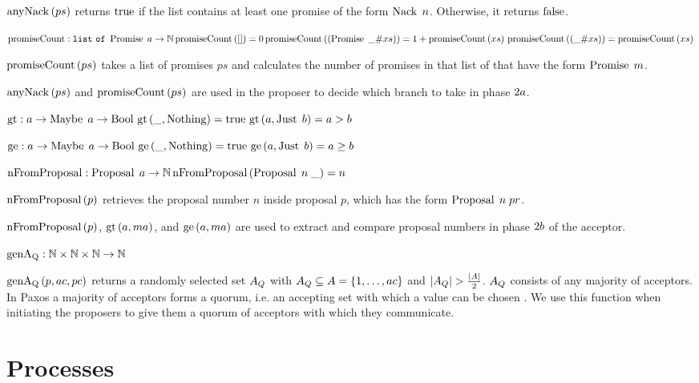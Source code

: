 $\operatorname{anyNack}\left(ps\right)$ returns $\operatorname{true}$ if the list contains at least one promise of the form $\operatorname{Nack}\; n$.
Otherwise, it returns $\operatorname{false}$.

$\operatorname{promiseCount} : \mathtt{list\ of\ } \operatorname{Promise}\; a \to \mathbb{N}\\
\operatorname{promiseCount}\left(\mathtt{[]}\right) = 0\\
\operatorname{promiseCount}\left(\left(\operatorname{Promise}\; \mathtt{\_} \mathtt{\#} xs\right)\right) = 1 + \operatorname{promiseCount}\left(xs\right)\\
\operatorname{promiseCount}\left(\left(\mathtt{\_} \mathtt{\#} xs\right)\right) = \operatorname{promiseCount}\left(xs\right)$

$\operatorname{promiseCount}\left(ps\right)$ takes a list of promises $ps$ and calculates the number of promises in that list of that have the form $\operatorname{Promise}\; m$.

$\operatorname{anyNack}\left(ps\right)$ and $\operatorname{promiseCount}\left(ps\right)$ are used in the proposer to decide which branch to take in phase $2a$.

$\operatorname{gt}: a \to \operatorname{Maybe}\; a \to \operatorname{Bool}\\
\operatorname{gt}\left(\mathtt{\_}, \operatorname{Nothing}\right) = \operatorname{true}\\
\operatorname{gt}\left(a, \operatorname{Just}\; b\right) = a > b$

$\operatorname{ge}: a \to \operatorname{Maybe}\; a \to \operatorname{Bool}\\
\operatorname{ge}\left(\mathtt{\_}, \operatorname{Nothing}\right) = \operatorname{true}\\
\operatorname{ge}\left(a, \operatorname{Just}\; b\right) = a \ge b$

$\operatorname{nFromProposal} : \operatorname{Proposal}\; a \to \mathbb{N}\\
\operatorname{nFromProposal}\left(\operatorname{Proposal}\; n\; \mathtt{\_} \right) = n$

$\operatorname{nFromProposal}\left(p \right)$ retrieves the proposal number $n$ inside proposal $p$, which has the form $\operatorname{Proposal}\; n\; pr$.

$\operatorname{nFromProposal}\left(p \right)$, $\operatorname{gt}\left(a, ma\right)$, and $\operatorname{ge}\left(a, ma\right)$ are used to extract and compare proposal numbers in phase $2b$ of the acceptor.

$\operatorname{genA_Q} : \mathbb{N} \times \mathbb{N} \times \mathbb{N} \to \mathbb{N}$

$\operatorname{genA_Q}\left(p, ac, pc\right)$ returns a randomly selected set $A_Q$ with $A_Q \subseteq A = \left\{1, \dots, ac\right\}$ and $|A_Q| > \frac{|A|}{2}$.
$A_Q$ consists of any majority of acceptors.
In Paxos a majority of acceptors forms a quorum, i.e. an accepting set with which a value can be chosen \cite{lower_bounds}.
We use this function when initiating the proposers to give them a quorum of acceptors with which they communicate.

\section{Processes}
